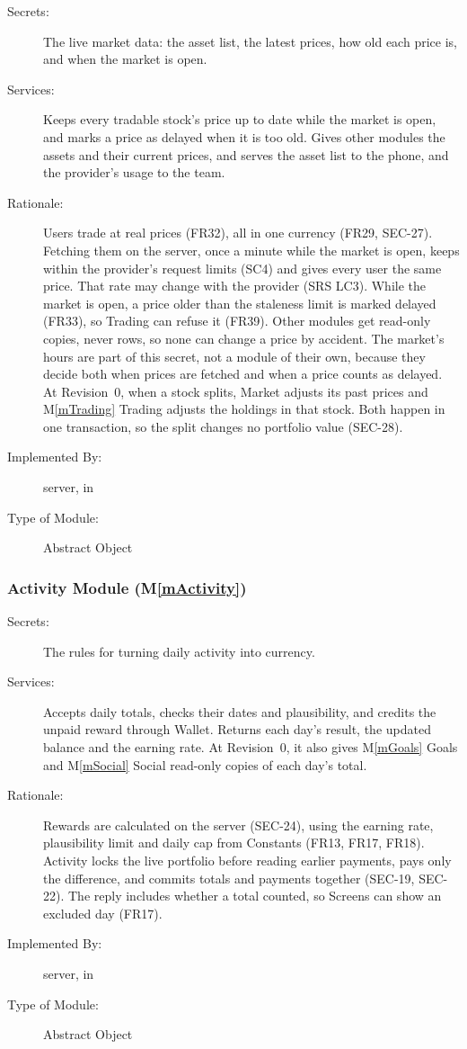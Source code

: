 \documentclass[12pt, titlepage]{article}
\newcommand{\mref}[1]{M\ref{#1}}
\begin{document}
\begin{description}
\item[Secrets:] The live market data: the asset list, the latest prices, how old each price is, and when the market is open.
\item[Services:] Keeps every tradable stock's price up to date while the market is open, and marks a price as delayed when it is too old. Gives other modules the assets and their current prices, and serves the asset list to the phone, and the provider's usage to the team.
\item[Rationale:] Users trade at real prices (FR32), all in one currency (FR29, SEC-27). Fetching them on the server, once a minute while the market is open, keeps within the provider's request limits (SC4) and gives every user the same price. That rate may change with the provider (SRS LC3). While the market is open, a price older than the staleness limit is marked delayed (FR33), so Trading can refuse it (FR39). Other modules get read-only copies, never rows, so none can change a price by accident. The market's hours are part of this secret, not a module of their own, because they decide both when prices are fetched and when a price counts as delayed. At Revision~0, when a stock splits, Market adjusts its past prices and \mref{mTrading} Trading adjusts the holdings in that stock. Both happen in one transaction, so the split changes no portfolio value (SEC-28).
\item[Implemented By:] \progname{} server, in 
\item[Type of Module:] Abstract Object
\end{description}

\subsubsection{Activity Module (\mref{mActivity})}

\begin{description}
\item[Secrets:] The rules for turning daily activity into currency.
\item[Services:] Accepts daily totals, checks their dates and plausibility,
  and credits the unpaid reward through Wallet. Returns each day's result,
  the updated balance and the earning rate. At Revision~0, it also gives
  \mref{mGoals} Goals and \mref{mSocial} Social read-only copies of each
  day's total.
\item[Rationale:] Rewards are calculated on the server (SEC-24), using the
  earning rate, plausibility limit and daily cap from Constants (FR13, FR17,
  FR18). Activity locks the live portfolio before reading earlier payments,
  pays only the difference, and commits totals and payments together
  (SEC-19, SEC-22). The reply
  includes whether a total counted, so Screens can show an excluded day
  (FR17). 
\item[Implemented By:] \progname{} server, in 
\item[Type of Module:] Abstract Object
\end{description}
\end{document}
